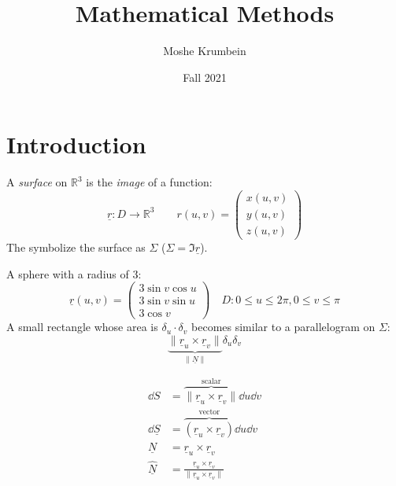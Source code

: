 \documentclass[00_complete]{subfiles}
\title{Mathematical Methods}
\author{Moshe Krumbein}
\date{Fall 2021}
\begin{document}
\section{Introduction}

\begin{reminder}
    A \emph{surface} on $\mathbb{R}^3$ is the \emph{image} of a function:
        $$\underline r: D\to \mathbb{R}^3 \qquad r(u,v)=\begin{pmatrix}
            x(u,v) \\ y(u,v) \\ z(u,v)
        \end{pmatrix}$$
    The symbolize the surface as $\Sigma$ ($\Sigma = \Im \underline r$).
\end{reminder}
\begin{example}
    A sphere with a radius of $3$:
    $$\underline r (u,v) = \begin{pmatrix}
        3 \sin v \cos u \\ 3 \sin v \sin u \\ 3 \cos v
    \end{pmatrix} \quad D: 0 \leq u \leq 2\pi, 0 \leq v \leq \pi$$
    A small rectangle whose area is $\delta_u \cdot \delta_v$ becomes similar
    to a parallelogram on $\Sigma$:
    $$\underbrace{\|\underline r_u \times \underline r_v\|}_{\|\underline N\|}\delta_u\delta_v$$
\end{example}
\begin{symbols}
    \begin{align*}
        \dd{S}&=\overbrace{\|\underline r_u \times \underline
        r_v\|}^{\text{scalar}}\dd{u}\dd{v} \\
        \dd{\underline S} &= \overbrace{(\underline r_u \times \underline
        r_v)}^{\text{vector}}\dd{u}\dd{v} \\
        \underline N &= \underline r_u \times \underline r_v \\
        \underline{\hat N} &= \frac{\underline r_u \times \underline
        r_v}{\|\underline r_u \times \underline r_v\|} \\
    \end{align*}
\end{symbols}
\end{document}
